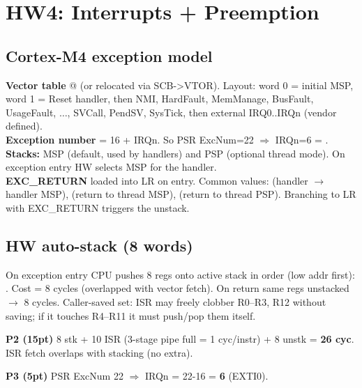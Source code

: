 \section{HW4: Interrupts + Preemption}

\subsection{Cortex-M4 exception model}
\textbf{Vector table} @  (or relocated via SCB->VTOR). Layout: word 0 = initial MSP, word 1 = Reset handler, then NMI, HardFault, MemManage, BusFault, UsageFault, $\ldots$, SVCall, PendSV, SysTick, then external IRQ0..IRQn (vendor defined).\\
\textbf{Exception number} = 16 + IRQn. So PSR ExcNum=22 $\Rightarrow$ IRQn=6 = .\\
\textbf{Stacks:} MSP (default, used by handlers) and PSP (optional thread mode). On exception entry HW selects MSP for the handler.\\
\textbf{EXC\_RETURN} loaded into LR on entry. Common values:  (handler $\to$ handler MSP),  (return to thread MSP),  (return to thread PSP). Branching to LR with EXC\_RETURN triggers the unstack.

\subsection{HW auto-stack (8 words)}
On exception entry CPU pushes 8 regs onto active stack in order (low addr first): . Cost = 8 cycles (overlapped with vector fetch). On return same regs unstacked $\to$ 8 cycles. Caller-saved set: ISR may freely clobber R0--R3, R12 without saving; if it touches R4--R11 it must push/pop them itself.

\begin{hwp}\textbf{P2 (15pt)} 8 stk + 10 ISR (3-stage pipe full = 1 cyc/instr) + 8 unstk = \textbf{26 cyc}. ISR fetch overlaps with stacking (no extra).\end{hwp}
\begin{hwp}\textbf{P3 (5pt)} PSR ExcNum 22 $\Rightarrow$ IRQn = 22-16 = \textbf{6} (EXTI0).\end{hwp}

